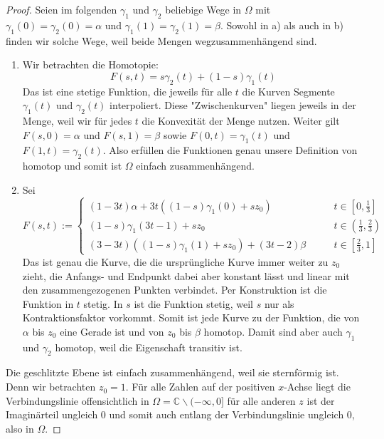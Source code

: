 \documentclass[11pt]{article}
\begin{document}
    \begin{proof}
        Seien im folgenden $\gamma_1$ und $\gamma_2$ beliebige Wege in $\Omega$ mit $\gamma_1(0)=\gamma_2(0)=
        \alpha$ und $\gamma_1(1)=\gamma_2(1)=\beta$. Sowohl in a) als auch in b) finden wir solche Wege, weil
        beide Mengen wegzusammenhängend sind.
        \begin{enumerate}[label = (\alph*)]
            \item Wir betrachten die Homotopie:
            $$F(s,t) = s\gamma_2(t)+(1-s)\gamma_1(t)$$
            Das ist eine stetige Funktion, die jeweils für alle $t$ die Kurven Segmente $\gamma_1(t)$ und
            $\gamma_2(t)$ interpoliert. Diese "Zwischenkurven" liegen jeweils in der Menge, weil wir für jedes
            $t$ die Konvexität der Menge nutzen. Weiter gilt $F(s,0)=\alpha$ und $F(s,1)=\beta$ sowie
            $F(0,t)=\gamma_1(t)$ und $F(1,t)=\gamma_2(t)$. Also erfüllen die Funktionen genau unsere Definition
            von homotop und somit ist $\Omega$ einfach zusammenhängend.
            \item Sei
            $$F(s,t):=
            \begin{cases}
                (1-3t)\alpha + 3t((1-s)\gamma_1(0)+sz_0)\qquad & t\in\left[0,\frac{1}{3}\right]\\
                (1-s)\gamma_1(3t-1)+sz_0\qquad & t\in\left(\frac{1}{3},\frac{2}{3}\right)\\
                (3-3t)((1-s)\gamma_1(1)+sz_0) + (3t-2)\beta\qquad & t\in\left[\frac{2}{3},1\right]
            \end{cases}$$
            Das ist genau die Kurve, die die ursprüngliche Kurve immer weiter zu $z_0$ zieht, die Anfangs- und
            Endpunkt dabei aber konstant lässt und linear mit den zusammengezogenen Punkten verbindet.
            Per Konstruktion ist die Funktion in $t$ stetig. In $s$ ist die
            Funktion stetig, weil $s$ nur als Kontraktionsfaktor vorkommt. Somit ist jede Kurve zu der Funktion,
            die von $\alpha$ bis $z_0$ eine Gerade ist und von $z_0$ bis $\beta$ homotop. Damit sind aber auch
            $\gamma_1$ und $\gamma_2$ homotop, weil die Eigenschaft transitiv ist.
        \end{enumerate}
        Die geschlitzte Ebene ist einfach zusammenhängend, weil sie sternförmig ist. Denn wir betrachten
        $z_0=1$. Für alle Zahlen auf der positiven $x$-Achse liegt die Verbindungslinie offensichtlich in
        $\Omega = \mathbb{C} \backslash(-\infty, 0]$ für alle anderen $z$ ist der Imaginärteil ungleich
        $0$ und somit auch entlang der Verbindungslinie ungleich $0$, also in $\Omega$.
    \end{proof}
\end{document}
